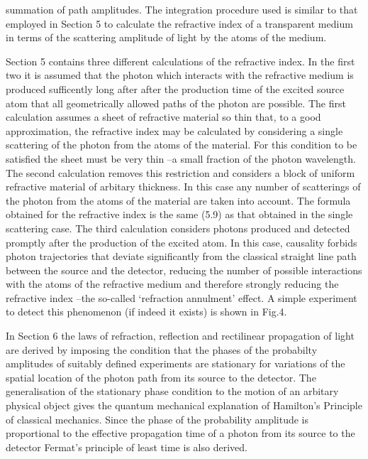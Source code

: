 {    summation of path amplitudes. The integration procedure used is similar to that employed
   in Section 5 to calculate the refractive index of a transparent medium in terms of the
   scattering amplitude of light by the atoms of the medium.
   \par Section 5 contains three different calculations of the refractive index.
  In the first two it is assumed that the photon which interacts with the refractive medium
 is produced sufficently long after after the production time of the excited source atom
  that all geometrically allowed paths of the photon are possible. The first calculation 
  assumes a sheet of refractive material so thin that, to a good approximation, the refractive index
  may be calculated by considering a single scattering of the photon from the atoms 
  of the material. For this condition to be satisfied the sheet must be very thin --a small fraction
  of the photon wavelength. The second calculation removes this restriction and considers a block
  of uniform refractive material of arbitary thickness. In this case any number of scatterings of the photon from the
  atoms of the material are taken into account. The formula obtained for the refractive index is
  the same (5.9) as that obtained in the single scattering case. The third calculation
   considers photons produced and detected promptly after the production of the excited atom. In this case,
   causality  forbids photon trajectories that deviate significantly from the classical straight 
  line path between the source and the detector, reducing the number of possible interactions
   with the atoms of the refractive medium and therefore strongly reducing the refractive 
  index --the so-called `refraction annulment' effect. A simple experiment to detect this phenomenon
   (if indeed it exists) is shown in Fig.4.
   \par In Section 6 the laws of refraction, reflection and rectilinear propagation of light
  are derived by imposing the condition that the phases of the probabilty amplitudes of
   suitably defined experiments are stationary for variations of the spatial location 
   of the photon path from its source to the detector. The generalisation of the stationary
   phase condition to the motion of an arbitary physical object gives the quantum mechanical
   explanation of Hamilton's Principle of classical mechanics. Since the phase of the probability
   amplitude is proportional to the effective propagation time of a photon from its 
   source to the detector Fermat's principle of least time is also derived.
}
